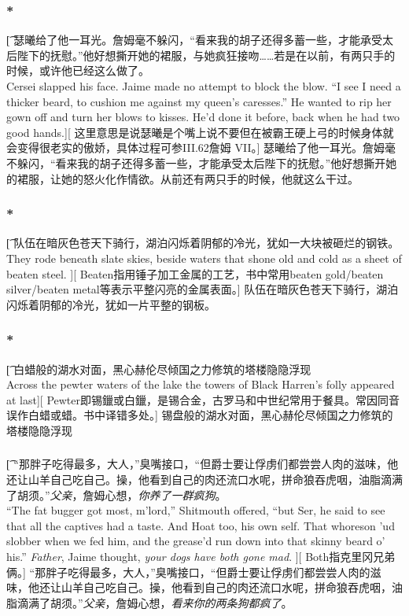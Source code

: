 \documentclass[12pt,a4paper]{article}
\begin{document}
\subsubsection{\color{red}*}\t[
	瑟曦给了他一耳光。詹姆毫不躲闪，“看来我的胡子还得多蓄一些，才能承受太后陛下的抚慰。”他好想撕开她的裙服，与她疯狂接吻……若是在以前，有两只手的时候，或许他已经这么做了。\\
	Cersei slapped his face. Jaime made no attempt to block the blow. “I see I need a thicker beard, to cushion me against my queen's caresses.” He wanted to rip her gown off and turn her blows to kisses. He'd done it before, back when he had two good hands.][
	这里意思是说瑟曦是个嘴上说不要但在被霸王硬上弓的时候身体就会变得很老实的傲娇，具体过程可参III.62詹姆 VII。]
	瑟曦给了他一耳光。詹姆毫不躲闪，“看来我的胡子还得多蓄一些，才能承受太后陛下的抚慰。”他好想撕开她的裙服，让她的怒火化作情欲。从前还有两只手的时候，他就这么干过。
	
\subsubsection{\color{red}*}\t[	
	队伍在暗灰色苍天下骑行，湖泊闪烁着阴郁的冷光，犹如一大块被砸烂的钢铁。\\
	They rode beneath slate skies, beside waters that shone old and cold as a sheet of beaten steel. ][
	Beaten指用锤子加工金属的工艺，书中常用beaten gold/beaten silver/beaten metal等表示平整闪亮的金属表面。]
	队伍在暗灰色苍天下骑行，湖泊闪烁着阴郁的冷光，犹如一片平整的钢板。
	
\subsubsection{\color{red}*}\t[	
	白蜡般的湖水对面，黑心赫伦尽倾国之力修筑的塔楼隐隐浮现\\
	Across the pewter waters of the lake the towers of Black Harren's folly appeared at last][
	Pewter即锡鑞或白鑞，是锡合金，古罗马和中世纪常用于餐具。常因同音误作白蜡或蜡。书中译错多处。]
	锡盘般的湖水对面，黑心赫伦尽倾国之力修筑的塔楼隐隐浮现
	
\subsubsection{}\t[
	 “那胖子吃得最多，大人，”臭嘴接口，“但爵士要让俘虏们都尝尝人肉的滋味，他还让山羊自己吃自己。操，他看到自己的肉还流口水呢，拼命狼吞虎咽，油脂滴满了胡须。”\emph{父亲}，詹姆心想，\emph{你养了一群疯狗}。\\
	 “The fat bugger got most, m'lord,” Shitmouth offered, “but Ser, he said to see that all the captives had a taste. And Hoat too, his own self. That whoreson 'ud slobber when we fed him, and the grease'd run down into that skinny beard o' his.” \emph{Father}, Jaime thought, \emph{your dogs have both gone mad}. ][
	 Both指克里冈兄弟俩。]
	 “那胖子吃得最多，大人，”臭嘴接口，“但爵士要让俘虏们都尝尝人肉的滋味，他还让山羊自己吃自己。操，他看到自己的肉还流口水呢，拼命狼吞虎咽，油脂滴满了胡须。”\emph{父亲}，詹姆心想，\emph{看来你的两条狗都疯了}。
	 
\end{document}
